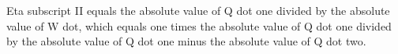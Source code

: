 Eta subscript II equals the absolute value of Q dot one divided by the absolute value of W dot, which equals one times the absolute value of Q dot one divided by the absolute value of Q dot one minus the absolute value of Q dot two.